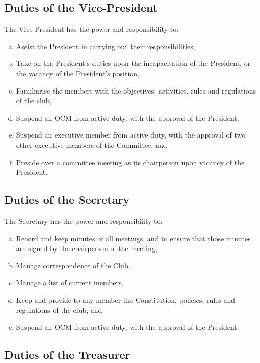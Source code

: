 \documentclass[a4paper,12pt]{article}
\begin{document}
\subsection{Duties of the Vice-President}

The Vice-President has the power and responsibility to:

\begin{enumerate}[a)]
	\item Assist the President in carrying out their responsibilities,
	\item Take on the President's duties upon the incapacitation of the President, or the vacancy of the President's position,
	\item Familiarise the members with the objectives, activities, rules and regulations of the club,
	\item Suspend an OCM from active duty, with the approval of the President,
	\item Suspend an executive member from active duty, with the approval of two other executive members of the Committee, and
	\item Preside over a committee meeting as its chairperson upon vacancy of the President.
\end{enumerate}

\subsection{Duties of the Secretary}

The Secretary has the power and responsibility to:

\begin{enumerate}[a)]
	\item Record and keep minutes of all meetings, and to ensure that those minutes are signed by the chairperson of the meeting,
	\item Manage correspondence of the Club,
	\item Manage a list of current members,
	\item Keep and provide to any member the Constitution, policies, rules and regulations of the club, and
	\item Suspend an OCM from active duty, with the approval of the President.
\end{enumerate}

\subsection{Duties of the Treasurer}
\end{document}
